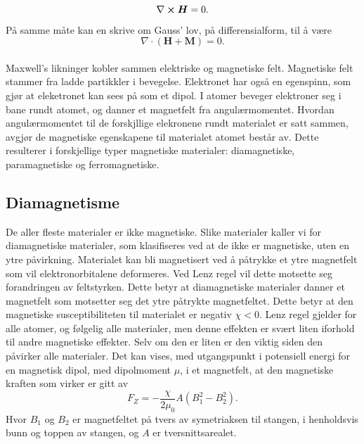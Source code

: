 \documentclass[%
 reprint,
 amsmath,amssymb,
 aps,
]{revtex4-1}
\begin{document}
\begin{equation}
  \nabla \cross \bm{H} = 0.
\end{equation}På samme måte kan en skrive om Gauss' lov, på differensialform, til å være
\begin{equation}
  \nabla \cdot \left(\bm{H}+\bm{M}\right) = 0.
\end{equation}
\\
Maxwell's likninger kobler sammen elektriske og magnetiske felt. Magnetiske felt stammer fra ladde partikkler i bevegelse. Elektronet har også en egenspinn, som gjør at eleketronet kan sees på som et dipol. I atomer beveger elektroner seg i bane rundt atomet, og danner et magnetfelt fra angulærmomentet. Hvordan angulærmomentet til de forskjllige elekronene rundt materialet er satt sammen, avgjør de magnetiske egenskapene til materialet atomet består av. Dette resulterer i forskjellige typer magnetiske materialer: diamagnetiske, paramagnetiske og ferromagnetiske.
\subsection{Diamagnetisme}
De aller fleste materialer er ikke magnetiske. Slike materialer kaller vi for diamagnetiske materialer, som klasifiseres ved at de ikke er magnetiske, uten en ytre påvirkning. Materialet kan bli magnetisert ved å påtrykke et ytre magnetfelt som vil elektronorbitalene deformeres. Ved Lenz regel vil dette motsette seg forandringen av feltstyrken. Dette betyr at diamagnetiske materialer danner et magnetfelt som motsetter seg det ytre påtrykte magnetfeltet. Dette betyr at den magnetiske susceptibiliteten til materialet er negativ $\chi < 0$. Lenz regel gjelder for alle atomer, og følgelig alle materialer, men denne effekten er svært liten iforhold til andre magnetiske effekter. Selv om den er liten er den viktig siden den påvirker alle materialer. Det kan vises, med utgangspunkt i potensiell energi for en magnetisk dipol, med dipolmoment $\mu$, i et magnetfelt, at den magnetiske kraften som virker er gitt av
\begin{equation}
  F_Z = -\frac{\chi}{2\mu_0}A\left(B_1^2 - B_2^2\right). \label{vismut}
\end{equation}
Hvor $B_1$ og $B_2$ er magnetfeltet på tvers av symetriaksen til stangen, i henholdsvis bunn og toppen av stangen, og $A$ er tversnittsarealet.
\end{document}
